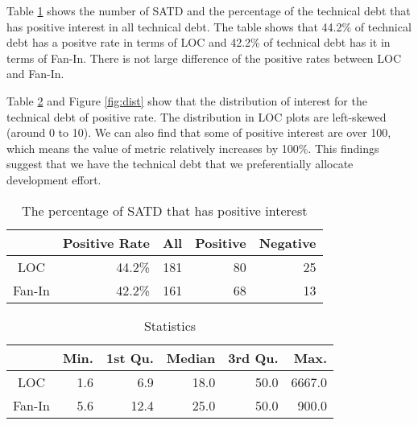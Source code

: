 Table \ref{tab:percentage} shows the number of SATD and the percentage of the technical debt that has positive interest in all technical debt. The table shows that 44.2\% of technical debt has a positve rate in terms of LOC and 42.2\% of technical debt has it in terms of Fan-In. 
There is not large difference of the positive rates between LOC and Fan-In. 

Table \ref{tab:statistic} and Figure \ref{fig:dist} show that the distribution of interest for the technical debt of positive rate. The distribution in LOC plots are left-skewed (around 0 to 10). We can also find that some of positive interest are over 100, which means the value of metric relatively increases by 100\%.
This findings suggest that we have the technical debt that we preferentially allocate development effort.

\begin{table}[tb]
  \caption{The percentage of SATD that has positive interest}
  \label{tab:percentage}
  \centering

  \begin{tabular}{c|r|rrr}
  \hline
        & Positive Rate & All & Positive & Negative \\
  \hline
   LOC  & 44.2\% & 181 &  80  &  25 \\
Fan-In  & 42.2\% & 161 &  68  &  13 \\
  \hline
  \end{tabular}
\end{table}

\begin{table}[tb]
  \caption{Statistics}
  \label{tab:statistic}
  \centering

  \begin{tabular}{c|rrrrr}
  \hline
        & Min. & 1st Qu. & Median & 3rd Qu. & Max. \\
  \hline
   LOC  & 1.6 &   6.9 &  18.0  &   50.0 & 6667.0 \\
Fan-In  & 5.6 &  12.4 &  25.0  &   50.0 &  900.0 \\
  \hline
  \end{tabular}
\end{table}






